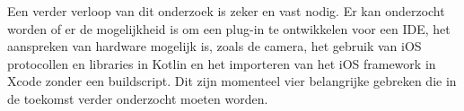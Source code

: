 Een verder verloop van dit onderzoek is zeker en vast nodig. Er kan onderzocht worden of er de mogelijkheid is om een plug-in te ontwikkelen voor een IDE, het aanspreken van hardware mogelijk is, zoals de camera, het gebruik van iOS protocollen en libraries in Kotlin en het importeren van het iOS framework in Xcode zonder een buildscript. Dit zijn momenteel vier belangrijke gebreken die in de toekomst verder onderzocht moeten worden.